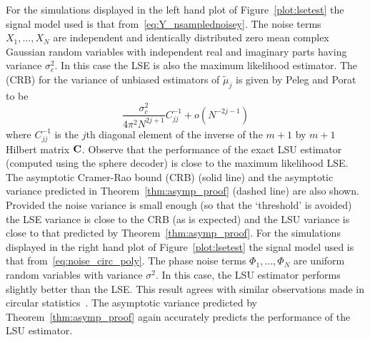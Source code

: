 \documentclass[journal]{IEEEtran}
\begin{document}
For the simulations displayed in the left hand plot of Figure~\ref{plot:lsetest} the signal model used is that from~\eqref{eq:Y_nsamplednoisey}.  The noise terms $X_1, \dots, X_N$ are independent and identically distributed zero mean complex Gaussian random variables with independent real and imaginary parts having variance $\sigma_c^2$.  In this case the LSE is also the maximum likelihood estimator.  The  (CRB) for the variance of unbiased estimators of $\tilde{\mu}_j$ is given by Peleg and Porat~\cite{Peleg1991_CRB_PPS_1991} to be
\[ 
\frac{\sigma_c^2}{4\pi^2 N^{2j + 1}} C^{-1}_{jj} + o(N^{-2j-1})
\]
where $C^{-1}_{jj}$ is the $j$th diagonal element of the inverse of the $m+1$ by $m+1$ Hilbert matrix $\mathbf{C}$.  Observe that the performance of the exact LSU estimator (computed using the sphere decoder) is close to the maximum likelihood LSE.  The asymptotic Cramer-Rao bound (CRB) (solid line) and the asymptotic variance predicted in Theorem~\ref{thm:asymp_proof} (dashed line) are also shown. Provided the noise variance is small enough (so that the `threshold' is avoided) the LSE variance is close to the CRB (as is expected) and the LSU variance is close to that predicted by Theorem~\ref{thm:asymp_proof}. 
For the simulations displayed in the right hand plot of Figure~\ref{plot:lsetest} the signal model used is that from~\eqref{eq:noise_circ_poly}.  The phase noise terms $\Phi_1, \dots, \Phi_N$ are uniform random variables with variance $\sigma^2$.  In this case, the LSU estimator performs slightly better than the LSE.  This result agrees with similar observations made in circular statistics~\cite{McKilliam_mean_dir_est_sq_arc_length2010}.  The asymptotic variance predicted by Theorem~\ref{thm:asymp_proof} again accurately predicts the performance of the LSU estimator. 
 
\end{document}
